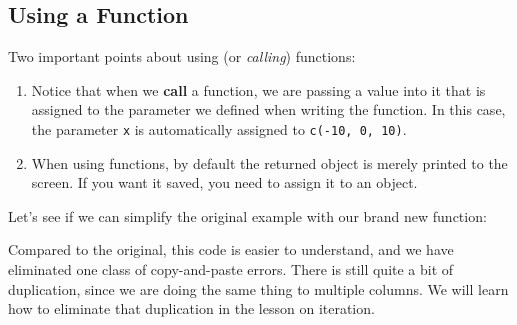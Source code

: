 \documentclass[]{book}
\newenvironment{Shaded}{\begin{snugshade}}{\end{snugshade}}
\newcommand{\KeywordTok}[1]{\textcolor[rgb]{0.13,0.29,0.53}{\textbf{#1}}}
\newcommand{\DataTypeTok}[1]{\textcolor[rgb]{0.13,0.29,0.53}{#1}}
\newcommand{\DecValTok}[1]{\textcolor[rgb]{0.00,0.00,0.81}{#1}}
\newcommand{\StringTok}[1]{\textcolor[rgb]{0.31,0.60,0.02}{#1}}
\newcommand{\ControlFlowTok}[1]{\textcolor[rgb]{0.13,0.29,0.53}{\textbf{#1}}}
\newcommand{\OperatorTok}[1]{\textcolor[rgb]{0.81,0.36,0.00}{\textbf{#1}}}
\newcommand{\NormalTok}[1]{#1}
\begin{document}
\subsection{Using a Function}\label{using-a-function}

Two important points about using (or \emph{calling}) functions:

\begin{enumerate}
\def\labelenumi{\arabic{enumi}.}
\item
  Notice that when we \textbf{call} a function, we are passing a value
  into it that is assigned to the parameter we defined when writing the
  function. In this case, the parameter \texttt{x} is automatically
  assigned to \texttt{c(-10,\ 0,\ 10)}.
\item
  When using functions, by default the returned object is merely printed
  to the screen. If you want it saved, you need to assign it to an
  object.
\end{enumerate}

Let's see if we can simplify the original example with our brand new
function:

\begin{Shaded}
\end{Shaded}

Compared to the original, this code is easier to understand, and we have
eliminated one class of copy-and-paste errors. There is still quite a
bit of duplication, since we are doing the same thing to multiple
columns. We will learn how to eliminate that duplication in the lesson
on iteration.
\end{document}
